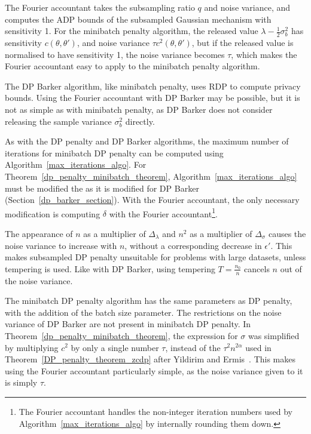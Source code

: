 \documentclass[english,twoside,openright]{HYgraduMLDS}
\begin{document}
The Fourier accountant takes the subsampling ratio \(q\) and noise variance,
and computes the ADP bounds of the subsampled Gaussian mechanism with sensitivity
1. For the minibatch penalty algorithm, the released value
\(\lambda - \frac{1}{2}\sigma_{b}^{2}\) has sensitivity \(c(\theta, \theta')\),
and noise variance \(\tau c^{2}(\theta, \theta')\), but if the released value is
normalised to have sensitivity 1, the noise variance becomes \(\tau\), which makes
the Fourier accountant easy to apply to the minibatch penalty algorithm.

The DP Barker algorithm, like minibatch penalty, uses RDP to compute privacy
bounds. Using the Fourier accountant with DP Barker may be possible, but it is
not as simple as with minibatch penalty, as DP Barker does not consider
releasing the sample variance \(\sigma_{b}^{2}\) directly.

As with the DP penalty and DP Barker algorithms, the maximum number of iterations
for minibatch DP penalty can be computed using Algorithm~\ref{max_iterations_algo}.
For Theorem~\ref{dp_penalty_minibatch_theorem}, Algorithm~\ref{max_iterations_algo}
must be modified the as it is modified for DP Barker
(Section~\ref{dp_barker_section}). With the Fourier accountant, the only necessary
modification is computing \(\delta\) with the Fourier accountant\footnote{
  The Fourier accountant handles the non-integer iteration numbers used
  by Algorithm~\ref{max_iterations_algo} by internally
  rounding them down.
}.

The appearance of \(n\) as a multiplier of \(\Delta_\lambda\) and 
\(n^2\) as a multiplier of \(\Delta_\sigma\) causes the noise variance to increase 
with \(n\), without a corresponding decrease in \(\epsilon'\). This makes subsampled 
DP penalty unsuitable for problems with large datasets, unless tempering is 
used. Like with DP Barker, using tempering \(T = \frac{n_0}{n}\) cancels \(n\)
out of the noise variance.

The minibatch DP penalty algorithm has the same parameters as DP penalty, with
the addition of the batch size parameter. The restrictions on the noise variance
of DP Barker are not present in minibatch DP penalty. In
Theorem~\ref{dp_penalty_minibatch_theorem}, the expression for \(\sigma\) was
simplified by multiplying \(c^{2}\) by only a single number \(\tau\), instead
of the \(\tau^{2}n^{2\alpha}\) used in Theorem~\ref{DP_penalty_theorem_zcdp}
after Yildirim and Ermis~\cite{YildirimE19}. This makes using the Fourier
accountant particularly simple, as the noise variance given to it is simply
\(\tau\).
\end{document}
